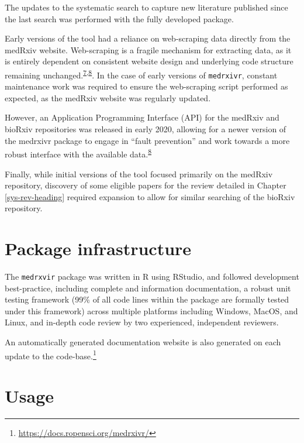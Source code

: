 \documentclass[a4paper, twoside]{templates/ociamthesis}
\begin{document}
The updates to the systematic search to capture new literature published since the last search was performed with the fully developed package.

Early versions of the tool had a reliance on web-scraping data directly from the medRxiv website. Web-scraping is a fragile mechanism for extracting data, as it is entirely dependent on consistent website design and underlying code structure remaining unchanged.\textsuperscript{\protect\hyperlink{ref-shaw2002}{7},\protect\hyperlink{ref-laprie1992}{8}}. In the case of early versions of \texttt{medrxivr}, constant maintenance work was required to ensure the web-scraping script performed as expected, as the medRxiv website was regularly updated.

However, an Application Programming Interface (API) for the medRxiv and bioRxiv repositories was released in early 2020, allowing for a newer version of the medrxivr package to engage in ``fault prevention'' and work towards a more robust interface with the available data.\textsuperscript{\protect\hyperlink{ref-laprie1992}{8}}

Finally, while initial versions of the tool focused primarily on the medRxiv repository, discovery of some eligible papers for the review detailed in Chapter \ref{sys-rev-heading} required expansion to allow for similar searching of the bioRxiv repository.

\hypertarget{package-infrastructure}{%
\section{Package infrastructure}\label{package-infrastructure}}

The \texttt{medrxvir} package was written in R using RStudio, and followed development best-practice, including complete and information documentation, a robust unit testing framework (99\% of all code lines within the package are formally tested under this framework) across multiple platforms including Windows, MacOS, and Linux, and in-depth code review by two experienced, independent reviewers.

An automatically generated documentation website is also generated on each update to the code-base.\footnote{\url{https://docs.ropensci.org/medrxivr/}}

\hypertarget{usage}{%
\section{Usage}\label{usage}}
\end{document}
